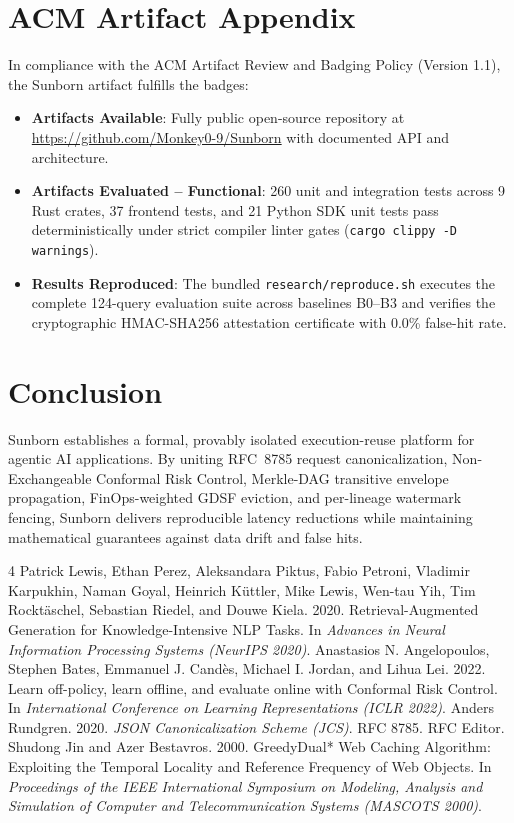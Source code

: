 \documentclass[sigconf,screen=true]{acmart}
\begin{document}
\section{ACM Artifact Appendix}
In compliance with the ACM Artifact Review and Badging Policy (Version 1.1), the Sunborn artifact fulfills the badges:
\begin{itemize}
    \item \textbf{Artifacts Available}: Fully public open-source repository at \url{https://github.com/Monkey0-9/Sunborn} with documented API and architecture.
    \item \textbf{Artifacts Evaluated -- Functional}: 260 unit and integration tests across 9 Rust crates, 37 frontend tests, and 21 Python SDK unit tests pass deterministically under strict compiler linter gates (\texttt{cargo clippy -D warnings}).
    \item \textbf{Results Reproduced}: The bundled \texttt{research/reproduce.sh} executes the complete 124-query evaluation suite across baselines B0--B3 and verifies the cryptographic HMAC-SHA256 attestation certificate with 0.0\% false-hit rate.
\end{itemize}

\section{Conclusion}
Sunborn establishes a formal, provably isolated execution-reuse platform for agentic AI applications. By uniting RFC~8785 request canonicalization, Non-Exchangeable Conformal Risk Control, Merkle-DAG transitive envelope propagation, FinOps-weighted GDSF eviction, and per-lineage watermark fencing, Sunborn delivers reproducible latency reductions while maintaining mathematical guarantees against data drift and false hits.


\begin{thebibliography}{4}
Patrick Lewis, Ethan Perez, Aleksandara Piktus, Fabio Petroni, Vladimir Karpukhin, Naman Goyal, Heinrich K{\"u}ttler, Mike Lewis, Wen-tau Yih, Tim Rockt{\"a}schel, Sebastian Riedel, and Douwe Kiela. 2020. Retrieval-Augmented Generation for Knowledge-Intensive NLP Tasks. In \emph{Advances in Neural Information Processing Systems (NeurIPS 2020)}.
Anastasios N. Angelopoulos, Stephen Bates, Emmanuel J. Cand{\`e}s, Michael I. Jordan, and Lihua Lei. 2022. Learn off-policy, learn offline, and evaluate online with Conformal Risk Control. In \emph{International Conference on Learning Representations (ICLR 2022)}.
Anders Rundgren. 2020. \emph{JSON Canonicalization Scheme (JCS)}. RFC 8785. RFC Editor.
Shudong Jin and Azer Bestavros. 2000. GreedyDual* Web Caching Algorithm: Exploiting the Temporal Locality and Reference Frequency of Web Objects. In \emph{Proceedings of the IEEE International Symposium on Modeling, Analysis and Simulation of Computer and Telecommunication Systems (MASCOTS 2000)}.
\end{thebibliography}
\end{document}
